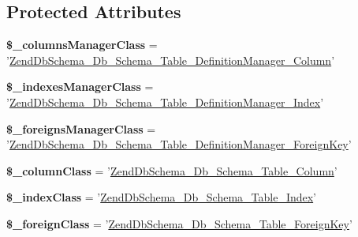\subsection*{Protected Attributes}
\begin{DoxyCompactItemize}
\item 
\hypertarget{classZendDbSchema__Db__Schema__Table_acd99b6cf0c33befc3a74bc057db5ce0e}{{\bfseries \$\-\_\-columns\-Manager\-Class} = '\hyperlink{classZendDbSchema__Db__Schema__Table__DefinitionManager__Column}{Zend\-Db\-Schema\-\_\-\-Db\-\_\-\-Schema\-\_\-\-Table\-\_\-\-Definition\-Manager\-\_\-\-Column}'}\label{classZendDbSchema__Db__Schema__Table_acd99b6cf0c33befc3a74bc057db5ce0e}

\item 
\hypertarget{classZendDbSchema__Db__Schema__Table_a44d47b3fc4563e05d27920f45af5814e}{{\bfseries \$\-\_\-indexes\-Manager\-Class} = '\hyperlink{classZendDbSchema__Db__Schema__Table__DefinitionManager__Index}{Zend\-Db\-Schema\-\_\-\-Db\-\_\-\-Schema\-\_\-\-Table\-\_\-\-Definition\-Manager\-\_\-\-Index}'}\label{classZendDbSchema__Db__Schema__Table_a44d47b3fc4563e05d27920f45af5814e}

\item 
\hypertarget{classZendDbSchema__Db__Schema__Table_ae3bf74ce1894cc432f6ca318dbe82ab3}{{\bfseries \$\-\_\-foreigns\-Manager\-Class} = '\hyperlink{classZendDbSchema__Db__Schema__Table__DefinitionManager__ForeignKey}{Zend\-Db\-Schema\-\_\-\-Db\-\_\-\-Schema\-\_\-\-Table\-\_\-\-Definition\-Manager\-\_\-\-Foreign\-Key}'}\label{classZendDbSchema__Db__Schema__Table_ae3bf74ce1894cc432f6ca318dbe82ab3}

\item 
\hypertarget{classZendDbSchema__Db__Schema__Table_a0a3d4e996493e562f576587a4f41fd0c}{{\bfseries \$\-\_\-column\-Class} = '\hyperlink{classZendDbSchema__Db__Schema__Table__Column}{Zend\-Db\-Schema\-\_\-\-Db\-\_\-\-Schema\-\_\-\-Table\-\_\-\-Column}'}\label{classZendDbSchema__Db__Schema__Table_a0a3d4e996493e562f576587a4f41fd0c}

\item 
\hypertarget{classZendDbSchema__Db__Schema__Table_a62efe13e216a9439be1627ab089bed04}{{\bfseries \$\-\_\-index\-Class} = '\hyperlink{classZendDbSchema__Db__Schema__Table__Index}{Zend\-Db\-Schema\-\_\-\-Db\-\_\-\-Schema\-\_\-\-Table\-\_\-\-Index}'}\label{classZendDbSchema__Db__Schema__Table_a62efe13e216a9439be1627ab089bed04}

\item 
\hypertarget{classZendDbSchema__Db__Schema__Table_a1e78aef014ea8aed788bed36020d3efc}{{\bfseries \$\-\_\-foreign\-Class} = '\hyperlink{classZendDbSchema__Db__Schema__Table__ForeignKey}{Zend\-Db\-Schema\-\_\-\-Db\-\_\-\-Schema\-\_\-\-Table\-\_\-\-Foreign\-Key}'}\label{classZendDbSchema__Db__Schema__Table_a1e78aef014ea8aed788bed36020d3efc}


\end{DoxyCompactItemize}
